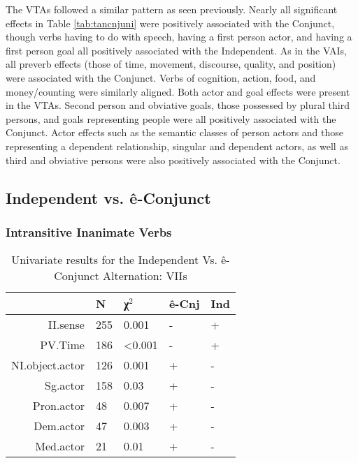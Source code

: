 The VTAs followed a similar pattern as seen previously. Nearly all significant effects in Table \ref{tab:tancnjuni} were positively associated with the Conjunct, though verbs having to do with speech, having a first person actor, and having a first person goal all positively associated with the Independent. As in the VAIs, all preverb effects (those of time, movement, discourse, quality, and position) were associated with the Conjunct. Verbs of cognition, action, food, and money/counting were similarly aligned. Both actor and goal effects were present in the VTAs. Second person and obviative goals, those possessed by plural third persons, and goals representing people were all positively associated with the Conjunct. Actor effects such as the semantic classes of person actors and those representing a dependent relationship, singular and dependent actors, as well as third and obviative persons were also positively associated with the Conjunct. 
\FloatBarrier


\FloatBarrier

\subsection{Independent vs. ê-Conjunct}
\FloatBarrier

\subsubsection{Intransitive Inanimate Verbs}

\begin{table}[H]
  \centering
\begin{tabular}{rllll}
    \toprule
&N&χ$^{2}$&ê-Cnj&Ind\\
\midrule
II.sense & 255 & 0.001 & - & + \\
PV.Time & 186 & \textless{}0.001 & - & + \\

NI.object.actor & 126 & 0.001 & + & - \\
Sg.actor & 158 & 0.03 & + & - \\
Pron.actor & 48 & 0.007 & + & - \\
Dem.actor & 47 & 0.003 & + & - \\
Med.actor & 21 & 0.01 & + & - \\
\bottomrule
  \end{tabular}
  \caption{
   Univariate results for the Independent Vs. ê-Conjunct Alternation: VIIs \\ \label{tab:iiiveuni}
  }
\end{table}

